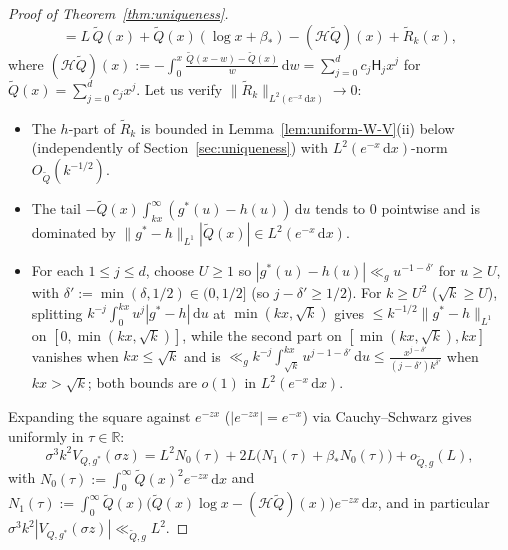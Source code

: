 \documentclass[11pt, reqno]{amsart}
\theoremstyle{remark}
\numberwithin{equation}{section}
\newcommand{\Harm}{\mathsf{H}}
\newcommand{\R}{\mathbb{R}}
\newcommand{\cH}{\mathcal{H}}
\newcommand{\dd}{\,\mathrm{d}}
\begin{document}
\begin{proof}[Proof of Theorem~\ref{thm:uniqueness}]
\[= L\,\widetilde{Q}(x) + \widetilde{Q}(x)(\log x + \beta_*) - (\cH\widetilde{Q})(x) + \widetilde{R}_k(x),
\]
where $(\cH\widetilde{Q})(x) := -\int_0^x \frac{\widetilde{Q}(x-w)-\widetilde{Q}(x)}{w}\dd w = \sum_{j=0}^d c_j \Harm_j x^j$
for $\widetilde{Q}(x) = \sum_{j=0}^d c_j x^j$. Let us verify $\|\widetilde{R}_k\|_{L^2(e^{-x}\dd x)} \to 0$:
\begin{itemize}
\item The $h$-part of $\widetilde{R}_k$ is bounded in Lemma~\ref{lem:uniform-W-V}(ii) below
(independently of Section~\ref{sec:uniqueness}) with $L^2(e^{-x}\dd x)$-norm $O_{\widetilde{Q}}(k^{-1/2})$.
\item The tail $-\widetilde{Q}(x)\int_{kx}^\infty (g^*(u)-h(u))\dd u$ tends to $0$ pointwise and is
dominated by $\|g^*-h\|_{L^1}|\widetilde{Q}(x)| \in L^2(e^{-x}\dd x)$.
\item For each $1 \le j \le d$, choose $U \ge 1$ so $|g^*(u)-h(u)| \ll_g u^{-1-\delta'}$ for $u \ge U$,
with $\delta' := \min(\delta, 1/2) \in (0, 1/2]$ (so $j - \delta' \ge 1/2$). For $k \ge U^2$ ($\sqrt{k} \ge U$),
splitting $k^{-j}\int_0^{kx} u^j |g^*-h|\dd u$ at $\min(kx, \sqrt{k})$ gives $\le k^{-1/2}\|g^*-h\|_{L^1}$ on
$[0, \min(kx, \sqrt{k})]$, while the second part on $[\min(kx, \sqrt{k}), kx]$ vanishes when $kx \le \sqrt{k}$
and is $\ll_g k^{-j}\int_{\sqrt{k}}^{kx} u^{j-1-\delta'}\dd u \le \frac{x^{j-\delta'}}{(j-\delta')k^{\delta'}}$
when $kx > \sqrt{k}$; both bounds are $o(1)$ in $L^2(e^{-x}\dd x)$.
\end{itemize}
Expanding the square against $e^{-zx}$ ($|e^{-zx}| = e^{-x}$) via Cauchy--Schwarz gives uniformly in $\tau \in \R$:
\begin{equation}\label{eq:Vg-exp}
\sigma^3 k^2 V_{Q, g^*}(\sigma z) = L^2 N_0(\tau) + 2L\bigl(N_1(\tau) + \beta_* N_0(\tau)\bigr) + o_{\widetilde{Q}, g}(L),
\end{equation}
with $N_0(\tau) := \int_0^\infty \widetilde{Q}(x)^2 e^{-zx}\dd x$ and
$N_1(\tau) := \int_0^\infty \widetilde{Q}(x)\bigl(\widetilde{Q}(x)\log x - (\cH\widetilde{Q})(x)\bigr) e^{-zx}\dd x$,
and in particular $\sigma^3 k^2 |V_{Q, g^*}(\sigma z)| \ll_{\widetilde{Q}, g} L^2$.


\end{proof}
\end{document}
